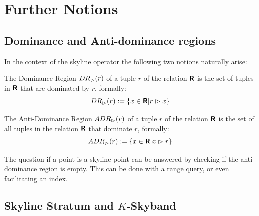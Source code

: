 %
%

\section{Further Notions}
\subsection{Dominance and Anti-dominance regions}
In the context of the skyline operator the following two notions naturally
arise:

\begin{definition}
The Dominance Region $DR_\vartriangleright(r)$ of a tuple $r$ of the relation
$\textnormal{\bf\textsf{R}}$ is the set of tuples in $\textnormal{\bf\textsf{R}}$ that are dominated
by $r$, formally:
\[
DR_\vartriangleright(r) := \{ x \in \textnormal{\bf\textsf{R}} | r \vartriangleright x \}
\]
\end{definition}

\begin{definition}
The Anti-Dominance Region $ADR_\vartriangleright(r)$ of a tuple $r$ of the
relation $\textnormal{\bf\textsf{R}}$ is the set of all tuples in the relation $\textnormal{\bf\textsf{R}}$
that dominate $r$, formally:
\[
ADR_\vartriangleright(r) := \{ x \in \textnormal{\bf\textsf{R}} | x \vartriangleright r \}
\]
\end{definition}

The question if a point is a skyline point can be answered by checking
if the anti-dominance region is empty.  This can be done with a range
query, or even facilitating an index.

\subsection{Skyline Stratum and $K$-Skyband}
\label{sec:skyline-stratum}

